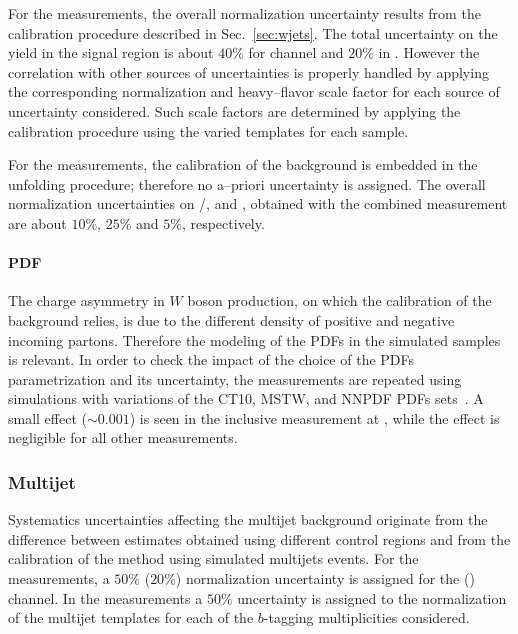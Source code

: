 For the \seventev{} measurements, the overall \wjets{} normalization
uncertainty results from the calibration procedure described in
Sec.~\ref{sec:wjets}. The total uncertainty on the \wjets{} yield in
the signal region is about $40\%$ for \ejets{} channel and $20\%$ in
\mujets{}. However the correlation with other sources of uncertainties
is properly handled by applying the corresponding normalization and
heavy--flavor scale factor for each source of uncertainty considered.
Such scale factors are determined by applying the calibration
procedure using the varied templates for each sample.

For the \eighttev{} measurements, the calibration of the \wjets{}
background is embedded in the unfolding procedure; therefore no
a--priori uncertainty is assigned. The overall normalization
uncertainties on \wbb{}/\wcc{}, \wc{} and \wlight, obtained with the
combined \ljets{} measurement  are about $10\%$, $25\%$ and $5\%$,
respectively.

\paragraph{PDF}
\label{sec:syst_pdf}

The charge asymmetry in $W$ boson production, on which the calibration
of the \wjets{} background relies, is due to the different density of
positive and negative incoming partons. Therefore the modeling of the
PDFs in the simulated \wjets samples is relevant. In order to check
the impact of the choice of the PDFs parametrization and its
uncertainty, the measurements are repeated using \wjets{} simulations
with variations of the CT10, MSTW, and NNPDF PDFs
sets~\cite{pdf4lhc}. A small effect ($\sim0.001$) is seen in the
inclusive \ac{} measurement at \seventev{}, while the effect is
negligible for all other measurements.  

\subsubsection{Multijet}
\label{sec:syst_qcd}

Systematics uncertainties affecting the multijet background originate
from the difference between estimates obtained using different control
regions and from the calibration of the method using simulated
multijets events. For the \seventev{} measurements, a $50\%$ ($20\%$)
normalization uncertainty is assigned for the \ejets{} (\mujets{})
channel.
In the \eighttev{} measurements a $50\%$ uncertainty is assigned to the
normalization of the multijet templates for each of the $b$-tagging
multiplicities considered.
